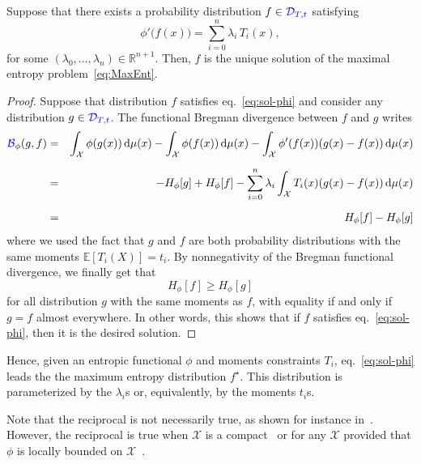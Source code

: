 \documentclass[entropy,article,submit,moreauthors,pdftex]{Definitions/mdpi}
\newcommand{\SZ}[1]{{\color{blue} #1}}                                       %
\def\dmu{\mathrm{d}\mu}%
\def\fB{\mathcal{B}}%
\def\Rset{\mathbb{R}}%
\def\X{\mathcal{X}}%
\def\D{\mathcal{D}}%
\newcommand{\Esp}[1]{\mathbb{E}\left[ #1 \right]}%
\begin{document}
\begin{Proposition}
\label{prop:sol-phi}
%
  Suppose that there exists a probability distribution $f \in \SZ{\D_{T,t}}$ satisfying
  \begin{equation}\label{eq:sol-phi}
  \phi'\big(f(x)\big) = \sum_{i=0}^n \lambda_i \, T_i(x),
  \end{equation}
  for  some $(\lambda_0,\ldots,\lambda_n)  \in \Rset^{n+1}$.   Then, $f$  is the
  unique solution of the maximal entropy problem~\eqref{eq:MaxEnt}.
\end{Proposition}
%
\begin{proof}
  Suppose that  distribution $f$  satisfies eq.~\eqref{eq:sol-phi}  and consider
  any distribution $g  \in \SZ{\D_{T,t}}$.  The functional Bregman  divergence between $f$
  and $g$ writes
  \begin{eqnarray*}
  \SZ{\fB}_\phi(g,f) & = & \int_\X \phi(g(x)) \, \dmu(x) - \int_\X \phi(f(x)) \,
  \dmu(x) - \int_\X \phi'(f(x)) \left( g(x) - f(x) \right) \, \dmu(x)
  \\[2mm]
  & = & - H_\phi[g] + H_\phi[f] - \sum_{i=0}^n \lambda_i \int_\X T_i(x) \left(
  g(x) - f(x) \right) \, \dmu(x)
  \\[2mm]
  & = & H_\phi[f] - H_\phi[g]
  \end{eqnarray*}
  where we  used the fact  that $g$ and  $f$ are both  probability distributions
  with the same  moments $\Esp{T_i(X)} = t_i$.  By nonnegativity  of the Bregman
  functional divergence, we finally get that
  \[
  H_\phi[f] \ge H_\phi[g]
  \]
  for all distribution  $g$ with the same  moments as $f$, with  equality if and
  only if  $g = f$ almost  everywhere.  In other  words, this shows that  if $f$
  satisfies eq.~\eqref{eq:sol-phi}, then it is the desired solution.
\end{proof}

Hence,  given  an entropic  functional  $\phi$  and moments  constraints  $T_i$,
eq.~\eqref{eq:sol-phi}  leads the  the maximum  entropy distribution  $f^\star$.
This distribution is parameterized by  the $\lambda_i$s or, equivalently, by the
moments $t_i$s.

Note  that  the reciprocal  is  not  necessarily  true,  as shown  for  instance
in~\cite{BorLew93}.   However,   the  reciprocal   is  true   when  $\X$   is  a
compact~\cite{Gir97} or for any $\X$ provided  that $\phi$ is locally bounded on
$\X$~\cite{Gir07}.
\end{document}
